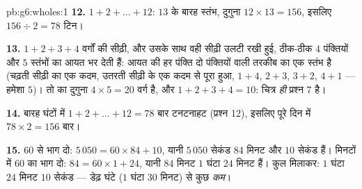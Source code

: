 \begin{solution}{pb:g6:wholes:1}
\textbf{12.} $1 + 2 + \dots + 12$: $13$ के बारह स्तंभ,
दुगुना  $12 \times 13 = 156$, इसलिए
$156 \div 2 = 78$ टिन।

\textbf{13.} $1 + 2 + 3 + 4$ वर्गों की सीढ़ी, और उसके साथ वही
सीढ़ी उलटी रखी हुई, ठीक-ठीक $4$ पंक्तियों और $5$ स्तंभों का आयत
भर देती हैं: आयत की हर पंक्ति दो पंक्तियों वाली तरकीब का एक
स्तंभ है (चढ़ती सीढ़ी का एक कदम, उतरती सीढ़ी के एक कदम से पूरा
हुआ, $1 + 4$, $2 + 3$, $3 + 2$, $4 + 1$ --- हमेशा $5$)। तो
 का दुगुना $4 \times 5 = 20$ वर्ग है, और
$1 + 2 + 3 + 4 = 10$: चित्र \emph{ही} प्रश्न 7 है।

\textbf{14.} बारह घंटों में $1 + 2 + \dots + 12 = 78$ बार
टनटनाहट (प्रश्न 12), इसलिए पूरे दिन में $78 \times 2 = 156$ बार।

\textbf{15.} $60$ से भाग दो: $5\,050 = 60 \times 84 + 10$, यानी
$5\,050$ सेकंड $84$ मिनट और $10$ सेकंड हैं। मिनटों में $60$ का
भाग दो: $84 = 60 \times 1 + 24$, यानी $84$ मिनट $1$ घंटा
$24$ मिनट हैं। कुल मिलाकर: $1$ घंटा $24$ मिनट $10$ सेकंड ---
डेढ़ घंटे ($1$ घंटा $30$ मिनट) से कुछ \emph{कम}।

\end{solution}
